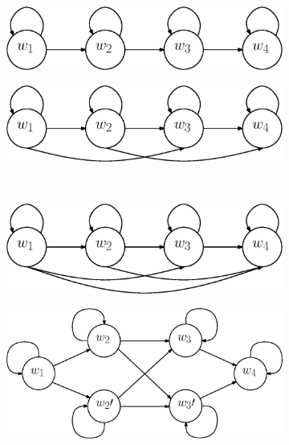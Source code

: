 \documentclass[a4paper, oneside]{csthesis}
\begin{document}
\begin{figure}
        \centering
        \begin{subfigure}[b]{0.35\textwidth}
                \centering
                \includegraphics[width=\textwidth]{figures/hmm-ltr1.eps}
                \caption{}
                \label{fig:hmm1}
        \end{subfigure}%
        \quad
        \begin{subfigure}[b]{0.35\textwidth}
                \centering
                \includegraphics[width=\textwidth]{figures/hmm-ltr2.eps}
                \caption{}
                \label{fig:hmm1}
        \end{subfigure}%

        ~ %
        \begin{subfigure}[b]{0.35\textwidth}
                \centering
                \includegraphics[width=\textwidth]{figures/hmm-ltr3.eps}
                \caption{}
                \label{fig:hmm1}
        \end{subfigure}%
        \quad
        \begin{subfigure}[b]{0.35\textwidth}
                \centering
                \includegraphics[width=\textwidth]{figures/hmm-ltr5.eps}
                \caption{}
                \label{fig:hmm1}
        \end{subfigure}%


\end{figure}
\end{document}
